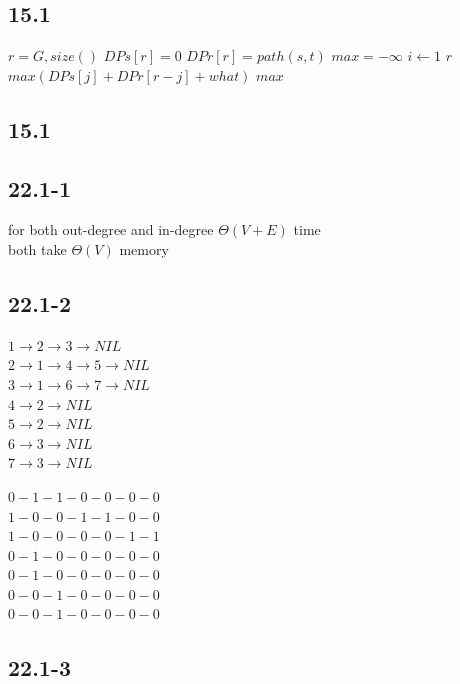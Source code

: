 \documentclass[]{article}
\begin{document}
\subsection{15.1}

\begin{codebox}
	\li $r = G,size()$
	\li $DPs[r] = 0$
	\li $DPr[r] = path(s,t)$
	\li $max = -\infty$
	\li \For $i \gets 1$ \To $r$
	\li		\Do $max (DPs[j] + DPr[r-j] + what)$
	\End
	\li \Return $max$
\end{codebox}

\subsection{15.1}

\subsection{22.1-1}
for both out-degree and in-degree $\Theta (V+E)$ time\\
both take $\Theta (V)$ memory

\subsection{22.1-2}

$1 \rightarrow 2 \rightarrow 3 \rightarrow NIL$\\
$2 \rightarrow 1 \rightarrow 4 \rightarrow 5 \rightarrow NIL$\\
$3 \rightarrow 1 \rightarrow 6 \rightarrow 7 \rightarrow NIL$\\
$4 \rightarrow 2 \rightarrow NIL$\\
$5 \rightarrow 2 \rightarrow NIL$\\
$6 \rightarrow 3 \rightarrow NIL$\\
$7 \rightarrow 3 \rightarrow NIL$

$0-1-1-0-0-0-0$\\
$1-0-0-1-1-0-0$\\
$1-0-0-0-0-1-1$\\
$0-1-0-0-0-0-0$\\
$0-1-0-0-0-0-0$\\
$0-0-1-0-0-0-0$\\
$0-0-1-0-0-0-0$

\subsection{22.1-3}
\end{document}
